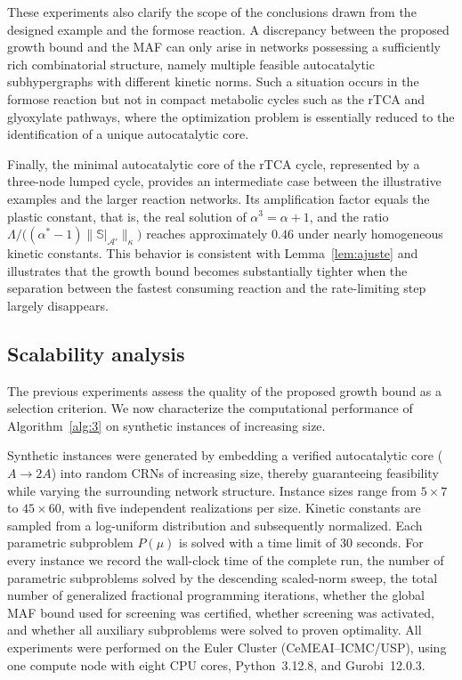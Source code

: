 \documentclass[a4paper,11pt,reqno]{amsart}
\begin{document}
These experiments also clarify the scope of the conclusions drawn from the
designed example and the formose reaction. A discrepancy between the proposed
growth bound and the MAF can only arise in networks possessing a sufficiently
rich combinatorial structure, namely multiple feasible autocatalytic
subhypergraphs with different kinetic norms. Such a situation occurs in the
formose reaction but not in compact metabolic cycles such as the rTCA and
glyoxylate pathways, where the optimization problem is essentially reduced to
the identification of a unique autocatalytic core.

Finally, the minimal autocatalytic core of the rTCA cycle, represented by a
three-node lumped cycle, provides an intermediate case between the illustrative
examples and the larger reaction networks. Its amplification factor equals the
plastic constant, that is, the real solution of
$\alpha^3=\alpha+1$, and the ratio
$\Lambda/\bigl((\alpha^*-1)\|\mathbb S|_{\mathcal A'}\|_{\kappa}\bigr)$
reaches approximately $0.46$ under nearly homogeneous kinetic constants. This
behavior is consistent with Lemma~\ref{lem:ajuste} and illustrates that the
growth bound becomes substantially tighter when the separation between the
fastest consuming reaction and the rate-limiting step largely disappears.



\subsection{Scalability analysis}
\label{sec:scalability}

The previous experiments assess the quality of the proposed growth bound as a
selection criterion. We now characterize the computational performance of
Algorithm~\ref{alg:3} on synthetic instances of increasing size.

Synthetic instances were generated by embedding a verified
autocatalytic core ($A\rightarrow2A$) into random CRNs of increasing size,
thereby guaranteeing feasibility while varying the surrounding network
structure. Instance sizes range from
$5\times7$ to $45\times60$, with five independent realizations per size. Kinetic constants
are sampled from a log-uniform distribution and subsequently normalized. Each
parametric subproblem $P(\mu)$ is solved with a time limit of $30$ seconds. For every instance we record the wall-clock time of the complete run, the number
of parametric subproblems solved by the descending scaled-norm sweep, the total
number of generalized fractional programming iterations, whether the global MAF
bound used for screening was certified, whether screening was activated, and
whether all auxiliary subproblems were solved to proven optimality.
All experiments were performed on the Euler Cluster
(CeMEAI--ICMC/USP), using one compute node with eight CPU cores, Python~3.12.8,
and Gurobi~12.0.3.
\end{document}
